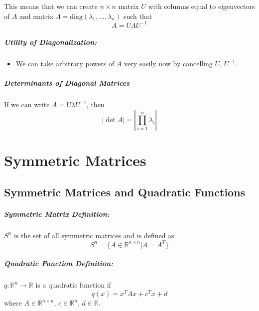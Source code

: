 \documentclass[a4paper,12pt]{report}
\def\reals{\mathbb{R}}
\begin{document}
This means that we can create $n\times n$ matrix $U$ with columns equal to eigenvectors of $A$ and matrix $\Lambda= \text{diag}(\lambda_1, ..., \lambda_n)$ such that 
\begin{equation}
A = U\Lambda U^{-1}
\end{equation}


\paragraph{Utility of Diagonalization: } 
\begin{itemize}
\item We can take arbitrary powers of $A$ very easily now by cancelling $U$, $U^{-1}$.
\end{itemize}


\paragraph{Determinants of Diagonal Matrices}

If we can write $A = U\lambda U^{-1}$, then 
\begin{equation}
|\det A| = |\prod_{i=1}^{n} \lambda_i|
\end{equation}

\chapter{Symmetric Matrices}

\section{Symmetric Matrices and Quadratic Functions}

\paragraph{Symmetric Matrix Definition: } $S^n$ is the set of all symmetric matrices and is defined as 
\begin{equation}
S^n = \{A \in \reals^{n\times n} | A = A^T\}
\end{equation}

\paragraph{Quadratic Function Definition: } $q:\reals^n\to \reals$ is a quadratic function if
\begin{equation}
q(x) = x^T A x + c^T x + d
\end{equation}
where $A\in \reals^{n\times n}$, $c\in \reals^n$, $d\in\reals$.
\end{document}

